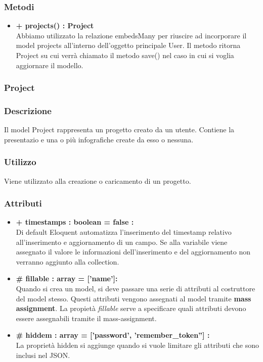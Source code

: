 	\subsubsection*{Metodi}
	\begin{itemize}
		\item \textbf{+ projects() : Project}\\
		Abbiamo utilizzato la relazione embedsMany per riuscire ad incorporare il model projects all'interno dell'oggetto principale User. Il metodo ritorna Project su cui verrà chiamato il metodo save() nel caso in cui si voglia aggiornare il modello.
	\end{itemize}
	
\newpage
\subsubsection{Project}


	\subsubsection*{Descrizione}
	Il model Project rappresenta un progetto creato da un utente. Contiene la presentazio e una o
più infografiche create da esso o nessuna.

	\subsubsection*{Utilizzo}
	Viene utilizzato alla creazione o caricamento di un progetto.
	
	\subsubsection*{Attributi}
	\begin{itemize}
		\item \textbf{+ timestamps : boolean = false :}\\
		Di default Eloquent automatizza l'inserimento del timestamp relativo all'inserimento e aggiornamento di un campo. Se alla variabile viene assegnato il valore le informazioni dell'inserimento e del aggiornamento non verranno aggiunto alla collection.
		\item \textbf{\# fillable : array = [’name’]:}\\
		Quando si crea un model, si deve passare una serie di attributi al costruttore del model stesso. Questi attributi vengono assegnati al model tramite \textbf{mass assignment}. La propietà \textit{fillable} serve a specificare quali attributi devono essere assegnabili tramite il mass-assignment.
		\item \textbf{\# hiddem : array = ['password', 'remember\_token''] : }\\
		La proprietà hidden si aggiunge quando si vuole limitare gli attributi che sono inclusi nel JSON.
	\end{itemize}
	
